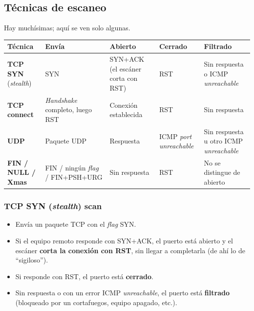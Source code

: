 \documentclass[11pt,a4paper]{report}
\begin{document}
\subsection{Técnicas de escaneo}
 
Hay muchísimas; aquí se ven solo algunas.
 
\begin{center}
\small
{\setlength{\aboverulesep}{0pt}\setlength{\belowrulesep}{0pt}\renewcommand{\arraystretch}{1.3}%
\begin{tabularx}{\linewidth}{>{\raggedright\arraybackslash}p{2.3cm} !{\color{gray!45}\vrule width 0.2pt} >{\raggedright\arraybackslash}X !{\color{gray!45}\vrule width 0.2pt} >{\raggedright\arraybackslash}X !{\color{gray!45}\vrule width 0.2pt} >{\raggedright\arraybackslash}X !{\color{gray!45}\vrule width 0.2pt} >{\raggedright\arraybackslash}X}
\toprule
\textbf{Técnica} & \textbf{Envía} & \textbf{Abierto} & \textbf{Cerrado} & \textbf{Filtrado} \\
\midrule
\textbf{TCP SYN} (\emph{stealth}) & SYN & SYN+ACK (el escáner corta con RST) & RST & Sin respuesta o ICMP \emph{unreachable} \\
\textbf{TCP connect} & \emph{Handshake} completo, luego RST & Conexión establecida & RST & Sin respuesta \\
\textbf{UDP} & Paquete UDP & Respuesta & ICMP \emph{port unreachable} & Sin respuesta u otro ICMP \emph{unreachable} \\
\textbf{FIN / NULL / Xmas} & FIN / ningún \emph{flag} / FIN+PSH+URG & Sin respuesta & RST & No se distingue de abierto \\
\bottomrule
\end{tabularx}}
\end{center}
 
\subsubsection*{TCP SYN (\emph{stealth}) scan}
\begin{itemize}
  \item Envía un paquete TCP con el \emph{flag} SYN.
  \item Si el equipo remoto responde con SYN+ACK, el puerto está abierto y el escáner \textbf{corta la conexión con RST}, sin llegar a completarla (de ahí lo de ``sigiloso'').
  \item Si responde con RST, el puerto está \textbf{cerrado}.
  \item Sin respuesta o con un error ICMP \emph{unreachable}, el puerto está \textbf{filtrado} (bloqueado por un cortafuegos, equipo apagado, etc.).
\end{itemize}
 
\end{document}
